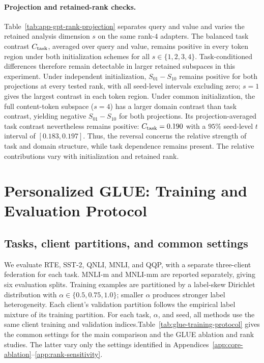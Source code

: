 \documentclass[11pt,letterpaper]{article}
\begin{document}
\paragraph{Projection and retained-rank checks.}
Table~\ref{tab:app-gpt-rank-projection} separates query and value and
varies the retained analysis dimension $s$ on the same rank-$4$ adapters.
The balanced task contrast $C_{\rm task}$, averaged over query and value,
remains positive in every token region under both initialization schemes
for all $s\in\{1,2,3,4\}$. Task-conditioned differences therefore remain
detectable in larger retained subspaces in this experiment.
Under independent initialization, $S_{01}-S_{10}$ remains positive for
both projections at every tested rank, with all seed-level intervals
excluding zero; $s=1$ gives the largest contrast in each token region.
Under common initialization, the full content-token subspace ($s=4$)
has a larger domain contrast than task contrast, yielding negative
$S_{01}-S_{10}$ for both projections. Its projection-averaged task
contrast nevertheless remains positive: $C_{\rm task}=0.190$ with a
$95\%$ seed-level $t$ interval of $[0.183,0.197]$. Thus, the reversal
concerns the relative strength of task and domain structure, while
task dependence remains present. The relative contributions vary with
initialization and retained rank.





\FloatBarrier


\section{Personalized GLUE: Training and Evaluation Protocol}
\label{app:glue-protocol}

\subsection{Tasks, client partitions, and common settings}

We evaluate RTE, SST-2, QNLI, MNLI, and QQP, with a separate three-client
federation for each task. MNLI-m and MNLI-mm are reported separately,
giving six evaluation splits. Training examples are partitioned by a
label-skew Dirichlet distribution with
$\alpha\in\{0.5,0.75,1.0\}$; smaller $\alpha$ produces stronger label
heterogeneity. Each client's validation partition follows the empirical
label mixture of its training partition. For each task, $\alpha$, and seed,
all methods use the same client training and validation indices.Table~\ref{tab:glue-training-protocol} gives the common settings for the
main comparison and the GLUE ablation and rank studies. The latter vary
only the settings identified in Appendices~\ref{app:core-ablation}--\ref{app:rank-sensitivity}.
\end{document}
